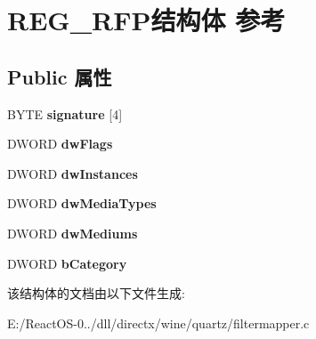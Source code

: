 \hypertarget{struct_r_e_g___r_f_p}{}\section{R\+E\+G\+\_\+\+R\+F\+P结构体 参考}
\label{struct_r_e_g___r_f_p}
\subsection*{Public 属性}
\begin{DoxyCompactItemize}
\item 
\mbox{\label{struct_r_e_g___r_f_p_a244e369a11f4936099093ce067156315}} 
B\+Y\+TE {\bfseries signature} \mbox{[}4\mbox{]}
\item 
\mbox{\label{struct_r_e_g___r_f_p_a7b1cc97214cac3d55d183ad237ad4377}} 
D\+W\+O\+RD {\bfseries dw\+Flags}
\item 
\mbox{\label{struct_r_e_g___r_f_p_a7878ed0b3c7718e28d10e5b542dc03fa}} 
D\+W\+O\+RD {\bfseries dw\+Instances}
\item 
\mbox{\label{struct_r_e_g___r_f_p_a4de0cdf983c255cbeaa3ad97fe13d452}} 
D\+W\+O\+RD {\bfseries dw\+Media\+Types}
\item 
\mbox{\label{struct_r_e_g___r_f_p_a980f24893177405a5ef25c8e184bac70}} 
D\+W\+O\+RD {\bfseries dw\+Mediums}
\item 
\mbox{\label{struct_r_e_g___r_f_p_a765d7114b70a2384b372333bb70f0d3e}} 
D\+W\+O\+RD {\bfseries b\+Category}
\end{DoxyCompactItemize}


该结构体的文档由以下文件生成\+:\begin{DoxyCompactItemize}
\item 
E\+:/\+React\+O\+S-\/0../dll/directx/wine/quartz/filtermapper.\+c\end{DoxyCompactItemize}
